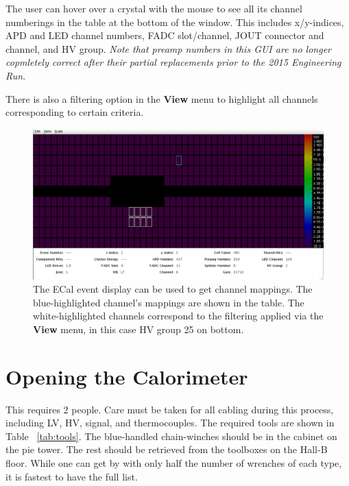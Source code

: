 \documentclass[12pt]{article}
\begin{document}
The user can hover over a crystal with the mouse to see all its channel numberings in the table at the bottom of the window.  This includes x/y-indices, APD and LED channel numbers, FADC slot/channel, JOUT connector and channel, and HV group.  {\em Note that preamp numbers in this GUI are no longer copmletely correct after their partial replacements prior to the 2015 Engineering Run}.  

There is also a filtering option in the {\bf View} menu to highlight all channels corresponding to certain criteria.

\begin{figure}[htbp]\centering
    \includegraphics[width=16cm]{pics/kylesGui.png}
    \caption{The ECal event display can be used to get channel mappings.  The blue-highlighted channel's mappings are shown in the table.  The white-highlighted channels correspond to the filtering applied via the {\bf View} menu, in this case HV group 25 on bottom.\label{fig:kylesGui}}
\end{figure}

\section{Opening the Calorimeter}

This requires 2 people.  Care must be taken for all cabling during this process, including LV, HV, signal, and thermocouples.  The required tools are shown in Table ~\ref{tab:tools}.  The blue-handled chain-winches should be in the cabinet on the pie tower.  The rest should be retrieved from the toolboxes on the Hall-B floor.  While one can get by with only half the number of wrenches of each type, it is fastest to have the full list. 
\end{document}
